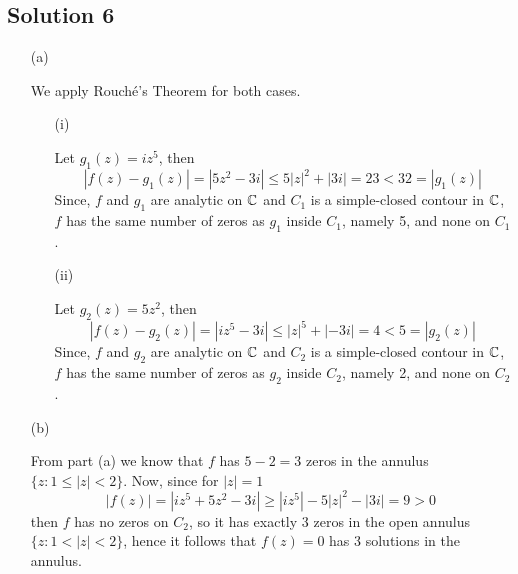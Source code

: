 \subsection*{Solution 6}

\begin{itemize}
\item[(a)]

We apply Rouch\'{e}'s Theorem for both cases.

\begin{itemize}
\item[(i)]

Let $g_1(z)=iz^5$, then
\[
|f(z)-g_1(z)| = |5z^2-3i| \le 5|z|^2 +|3i| = 23 < 32 = |g_1(z)|
\]
Since, $f$ and $g_1$ are analytic on $\mathbb{C}$ and $C_1$ is a
simple-closed contour in $\mathbb{C}$, $f$ has the same number of zeros
as $g_1$ inside $C_1$, namely 5, and none on $C_1$.

\item[(ii)]

Let $g_2(z)=5z^2$, then
\[
|f(z)-g_2(z)| = |iz^5-3i| \le |z|^5+|-3i| = 4 < 5 = |g_2(z)|
\]
Since, $f$ and $g_2$ are analytic on $\mathbb{C}$ and $C_2$ is a
simple-closed contour in $\mathbb{C}$, $f$ has the same number of zeros
as $g_2$ inside $C_2$, namely 2, and none on $C_2$.

\end{itemize}

\item[(b)]

From part (a) we know that $f$ has $5-2=3$ zeros in the annulus
$\{z:1\le|z|<2\}$.
Now, since for $|z|=1$
\[
|f(z)| = |iz^5+5z^2-3i| \ge |iz^5| - 5|z|^2 - |3i| = 9 > 0
\]
then $f$ has no zeros on $C_2$, so it has exactly 3 zeros in the open
annulus $\{z:1<|z|<2\}$, hence it follows that $f(z)=0$ has 3 solutions
in the annulus.

\end{itemize}

